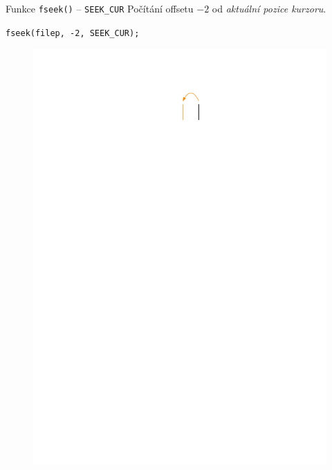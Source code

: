 \documentclass[14pt,aspectratio=169]{beamer}
\begin{document}
    \begin{frame}{Funkce \texttt{fseek()} -- \texttt{SEEK\_CUR}}
        Počítání offsetu $-2$ od \emph{aktuální pozice kurzoru}.
        \begin{center}
            \texttt{fseek(filep, -2, SEEK\_CUR);}
        \end{center}
        \begin{figure}
            \centering
            \includegraphics[scale=1]{images/cursor_fseek2.pdf}
        \end{figure}
    \end{frame}
\end{document}
